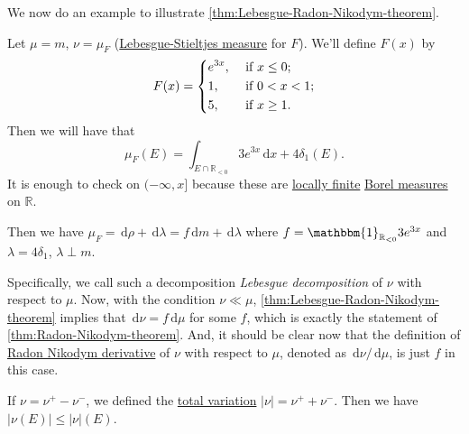 We now do an example to illustrate \autoref{thm:Lebesgue-Radon-Nikodym-theorem}.
\begin{eg}
	Let \(\mu = m\), \(\nu = \mu_F\) (\hyperref[def:Lebesgue-Stieltjes-measure]{Lebesgue-Stieltjes measure} for \(F\)). We'll define \(F(x)\) by
	\[
		F(x) = \begin{dcases}
			e^{3x}, & \text{ if } x\leq 0 ;   \\
			1,      & \text{ if } 0 < x < 1 ; \\
			5,      & \text{ if } x \geq 1 .
		\end{dcases}
	\]
	Then we will have that
	\[
		\mu_F(E) = \int_{E \cap \mathbb{R}_{< 0}} 3e^{3x} \,\mathrm{d}x + 4 \delta_1(E).
	\]
	It is enough to check on \((-\infty,x]\) because these are \hyperref[def:locally-finite]{locally finite} \hyperref[def:Borel-measure]{Borel measures} on \(\mathbb{R}\).

	Then we have \(\mu_F = \,\mathrm{d}\rho + \,\mathrm{d}\lambda = f\,\mathrm{d}m + \,\mathrm{d}\lambda\) where \(f = \mathbbm{1}_{\mathbb{R}_{< 0}}3e^{3x}\) and \(\lambda = 4\delta_1\),
	\(\lambda \perp m\).
\end{eg}

Specifically, we call such a decomposition \emph{Lebesgue decomposition} of \(\nu \) with respect to \(\mu \). Now, with the condition \(\nu \ll \mu \), \autoref{thm:Lebesgue-Radon-Nikodym-theorem}
implies that \(\,\mathrm{d} \nu = f \,\mathrm{d} \mu \) for some \(f\), which is exactly the statement of \autoref{thm:Radon-Nikodym-theorem}. And, it should
be clear now that the definition of \hyperref[def:Radon-Nikodym-derivative]{Radon Nikodym derivative} of \(\nu \) with respect to \(\mu \), denoted as
\(\,\mathrm{d} \nu / \,\mathrm{d} \mu \), is just \(f\) in this case.

\begin{prev}
	If \(\nu = \nu^+ - \nu^-\), we defined the \hyperref[def:total-variation]{total variation} \(\left\vert \nu \right\vert = \nu^+ + \nu^-\).
	Then we have \(\left\vert \nu(E) \right\vert \leq \left\vert \nu \right\vert(E)\).
\end{prev}

